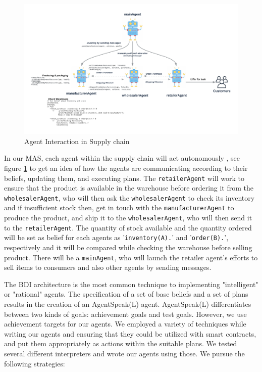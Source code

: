 \begin{figure}[h!]
    \centering
      \includegraphics[width=\linewidth]{includes/figures/agent.png} 
      \caption{Agent Interaction in Supply chain}
      \label{Agent Interaction}
    \end{figure}
  
\vspace{.5cm}

In our \ac{MAS}, each agent within the supply chain will act autonomously , see figure \ref{Agent Interaction} to get an idea of how the agents are communicating according to their beliefs, updating them, and executing plans. The \texttt{retailerAgent} will work to ensure that the product is available in the warehouse before ordering it from the \texttt{wholesalerAgent}, who will then ask the \texttt{wholesalerAgent} to check its inventory and if insufficient stock then, get in touch with the \texttt{manufacturerAgent} to produce the product, and ship it to the \texttt{wholesalerAgent}, who will then send it to the \texttt{retailerAgent}. The quantity of stock available and the quantity ordered will be set as belief for each agents as '\texttt{inventory(A).}' and '\texttt{order(B).}', respectively and it will be compared while checking the warehouse before selling product. There will be a \texttt{mainAgent}, who will launch the retailer agent's efforts to sell items to consumers and also other agents by sending messages.

\vspace{.5cm}

The \ac{BDI} architecture is the most common technique to implementing "intelligent" or "rational" agents. The specification of a set of base beliefs and a set of plans results in the creation of an AgentSpeak(L) agent. AgentSpeak(L) differentiates between two kinds of goals: achievement goals and test goals. However, we use achievement targets for our agents. We employed a variety of techniques while writing our agents and ensuring that they could be utilized with smart contracts, and put them appropriately as actions within the suitable plans. We tested several different interpreters and wrote our agents using those. We pursue the following strategies:
 \vspace{.3cm }

